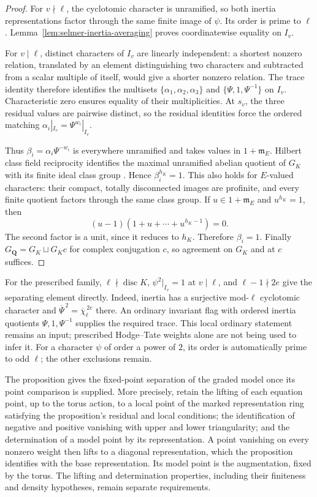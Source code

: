 \begin{proof}
For $v\nmid\ell$, the cyclotomic character is unramified, so
both inertia representations factor through the same finite image
of $\psi$. Its order is prime to $\ell$.
Lemma~\ref{lem:selmer-inertia-averaging} proves coordinatewise
equality on $I_v$.

For $v\mid\ell$, distinct characters of $I_v$ are linearly
independent: a shortest nonzero relation, translated by an element
distinguishing two characters and subtracted from a scalar multiple
of itself, would give a shorter nonzero relation.
The trace identity therefore identifies the multisets
$\{\alpha_1,\alpha_2,\alpha_3\}$ and $\{\Psi,1,\Psi^{-1}\}$
on $I_v$. Characteristic zero ensures equality of their
multiplicities. At $s_v$, the three residual values are pairwise
distinct, so the residual identities force the ordered matching
$\alpha_i|_{I_v}=\Psi^{w_i}|_{I_v}$.

Thus $\beta_i=\alpha_i\Psi^{-w_i}$ is everywhere unramified
and takes values in $1+\mathfrak m_E$.
Hilbert class field reciprocity identifies the maximal unramified
abelian quotient of $G_K$ with its finite ideal class group
\cite{milne-cft}. Hence $\beta_i^{h_K}=1$.
This also holds for $E$-valued characters: their compact,
totally disconnected images are profinite, and every finite
quotient factors through the same class group.
If $u\in1+\mathfrak m_E$ and $u^{h_K}=1$, then
\[
 (u-1)(1+u+\cdots+u^{h_K-1})=0.
\]
The second factor is a unit, since it reduces to $h_K$.
Therefore $\beta_i=1$.
Finally $G_{\mathbf Q}=G_K\sqcup G_Kc$ for complex
conjugation $c$, so agreement on $G_K$ and at $c$ suffices.
\end{proof}

For the prescribed family, $\ell\nmid\operatorname{disc}K$,
$\psi^2|_{I_v}=1$ at $v\mid\ell$, and
$\ell-1\nmid2e$ give the separating element directly.
Indeed, inertia has a surjective mod-$\ell$ cyclotomic character
and $\overline\Psi^{\,2}=\overline\chi_\ell^{\,2e}$ there.
An ordinary invariant flag with ordered inertia quotients
$\Psi,1,\Psi^{-1}$ supplies the required trace.
This local ordinary statement remains an input; prescribed
Hodge--Tate weights alone are not being used to infer it.
For a character $\psi$ of order a power of $2$, its order is
automatically prime to odd $\ell$; the other exclusions remain.

The proposition gives the fixed-point separation of the graded model
once its point comparison is supplied. More precisely, retain the
lifting of each equation point, up to the torus action, to a local
point of the marked representation ring satisfying the proposition's
residual and local conditions; the identification of
negative and positive vanishing with upper and lower triangularity;
and the determination of a model point by its representation.
A point vanishing on every nonzero weight then lifts to a diagonal
representation, which the proposition identifies with the base
representation. Its model point is the augmentation, fixed by the
torus. The lifting and determination properties, including their
finiteness and density hypotheses, remain separate requirements.

